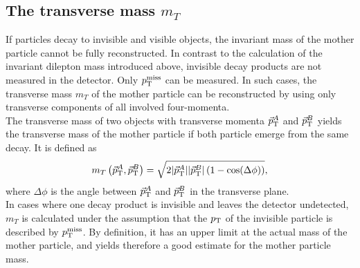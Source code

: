 \subsection*{The transverse mass $m_{T}$}
If particles decay to invisible and visible objects, the invariant mass of the mother particle cannot be fully reconstructed. In contrast to the calculation of the invariant dilepton mass introduced above, invisible decay products are not measured in the detector. Only $p_{\mathrm{T}}^\text{miss}$ can be measured. In such cases, the transverse mass $m_{T}$ of the mother particle can be reconstructed by using only transverse components of all involved four-momenta.\\
The transverse mass of two objects with transverse momenta ${\vec p}_{\mathrm{T}}^A$ and ${\vec p}_{\mathrm{T}}^B$ yields the transverse mass of the mother particle if both particle emerge from the same decay.
It is defined as
\begin{equation}
 m_T\left({\vec p}_{\mathrm{T}}^{A},{\vec p}_{\mathrm{T}}^B\right) = \sqrt{2|{\vec p}_{\mathrm{T}}^A||{\vec p}_{\mathrm{T}}^B|\left(1-\cos(\Delta\phi)\right)},
\end{equation}
where $\Delta\phi$ is the angle between ${\vec p}_{\mathrm{T}}^A$ and ${\vec p}_{\mathrm{T}}^B$ in the transverse plane.\\
In cases where one decay product is invisible and leaves the detector undetected, $m_T$ is calculated under the assumption that the $p_{\mathrm{T}}$ of the invisible particle is described by $p_{\mathrm{T}}^\text{miss}$. By definition, it has an upper limit at the actual mass of the mother particle, and yields therefore a good estimate for the mother particle mass.

